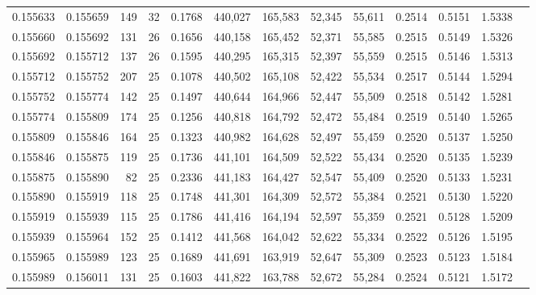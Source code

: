 \begin{tabular}{rrrrrrrrrrrrr}
0.155633 & 0.155659 & 149 &  32 &                                     0.1768 & 440,027 & 165,583 &  52,345 &  55,611 & 0.2514 & 0.5151 & 1.5338 \\
0.155660 & 0.155692 & 131 &  26 &                                     0.1656 & 440,158 & 165,452 &  52,371 &  55,585 & 0.2515 & 0.5149 & 1.5326 \\
0.155692 & 0.155712 & 137 &  26 &                                     0.1595 & 440,295 & 165,315 &  52,397 &  55,559 & 0.2515 & 0.5146 & 1.5313 \\
0.155712 & 0.155752 & 207 &  25 &                                     0.1078 & 440,502 & 165,108 &  52,422 &  55,534 & 0.2517 & 0.5144 & 1.5294 \\
0.155752 & 0.155774 & 142 &  25 &                                     0.1497 & 440,644 & 164,966 &  52,447 &  55,509 & 0.2518 & 0.5142 & 1.5281 \\
0.155774 & 0.155809 & 174 &  25 &                                     0.1256 & 440,818 & 164,792 &  52,472 &  55,484 & 0.2519 & 0.5140 & 1.5265 \\
0.155809 & 0.155846 & 164 &  25 &                                     0.1323 & 440,982 & 164,628 &  52,497 &  55,459 & 0.2520 & 0.5137 & 1.5250 \\
0.155846 & 0.155875 & 119 &  25 &                                     0.1736 & 441,101 & 164,509 &  52,522 &  55,434 & 0.2520 & 0.5135 & 1.5239 \\
0.155875 & 0.155890 &  82 &  25 &                                     0.2336 & 441,183 & 164,427 &  52,547 &  55,409 & 0.2520 & 0.5133 & 1.5231 \\
0.155890 & 0.155919 & 118 &  25 &                                     0.1748 & 441,301 & 164,309 &  52,572 &  55,384 & 0.2521 & 0.5130 & 1.5220 \\
0.155919 & 0.155939 & 115 &  25 &                                     0.1786 & 441,416 & 164,194 &  52,597 &  55,359 & 0.2521 & 0.5128 & 1.5209 \\
0.155939 & 0.155964 & 152 &  25 &                                     0.1412 & 441,568 & 164,042 &  52,622 &  55,334 & 0.2522 & 0.5126 & 1.5195 \\
0.155965 & 0.155989 & 123 &  25 &                                     0.1689 & 441,691 & 163,919 &  52,647 &  55,309 & 0.2523 & 0.5123 & 1.5184 \\
0.155989 & 0.156011 & 131 &  25 &                                     0.1603 & 441,822 & 163,788 &  52,672 &  55,284 & 0.2524 & 0.5121 & 1.5172 \\

\end{tabular}
